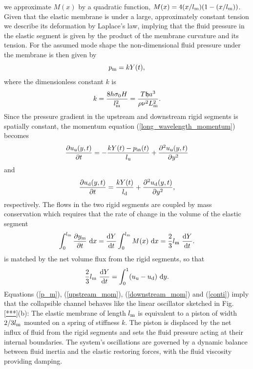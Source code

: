 \documentclass[aps,prl,reprint,superscriptaddress,floatfix]{revtex4-1}
\newcommand{\be}{\begin{equation}}
\newcommand{\ee}{\end{equation}}
\begin{document}
we approximate $M(x)$ by a quadratic function,
$M(x) = 4 (x/l_{\rm  m})(1-(x/l_{\rm m}))$. Given that the 
elastic membrane is under a large, approximately constant tension we describe
its deformation by Laplace's law, implying that the fluid pressure
in the elastic segment is given by the product
of the membrane curvature and its tension. For the assumed mode shape
the non-dimensional fluid pressure under the membrane is then given by
\be
\label{p_m}
p_{\rm m} = k Y(t),
\ee
where the dimensionless constant $k$ is
\be
k = \frac{8 h \sigma_0 H}{l_{\rm m}^2}
= \frac{T\mathfrak{h}a^3}{\rho \nu^2 L_{\rm m}^2}.
\ee
Since the pressure gradient in the upstream and downstream rigid
segments is spatially constant, the momentum equation
(\ref{long_wavelength_momentum}) becomes
\be
\label{upstream_mom}
\frac{\partial u_{\rm u}(y,t)}{\partial t} =
-\frac{k Y(t) - p_{\rm in}(t)}{l_{\rm u}} +
\frac{\partial^2 u_{\rm u}(y,t)}{\partial y^2}
\ee
and
\be
\label{downstream_mom}
\frac{\partial u_{\rm d}(y,t)}{\partial t} =
\frac{k Y(t)}{l_{\rm d}} +
\frac{\partial^2 u_{\rm d}(y,t)}{\partial y^2},
\ee
respectively.
The flows in the two rigid segments are coupled by
mass conservation which requires that the
rate of change in the volume of the elastic segment
\be
\int_0^{l_{\rm m}} \frac{\partial y_{\rm m}}{\partial t} \ {\rm d}x =
\frac{{\rm d}Y}{{\rm d}t} \int_0^{l_{\rm m}} M(x) \ {\rm d}x  = 
\frac{2}{3} l_{\rm m} \ \frac{{\rm d}Y}{{\rm d}t}.
\ee
is matched by the net volume flux from the rigid segments, so that
\be
\label{conti}
\frac{2}{3} l_{\rm m}  \ \frac{{\rm d}Y}{{\rm d}t}
= \int_0^1  (u_{\rm u} - u_{\rm d} ) \ {\rm d}y.
\ee
Equations (\ref{p_m}), (\ref{upstream_mom}), (\ref{downstream_mom})
and (\ref{conti}) imply that the collapsible
channel behaves like the linear oscillator sketched in 
Fig. \ref{***}(b): The elastic membrane of length $l_{\rm m}$
is equivalent to a piston of width $2/3l_{\rm m}$ mounted on a spring
of stiffness $k$. The piston is displaced by the net influx of
fluid from the rigid segments and sets the fluid pressure acting at
their internal boundaries. The system's oscillations are
governed by a dynamic balance between fluid inertia and the
elastic restoring forces, with the fluid viscosity providing
damping.
\end{document}
